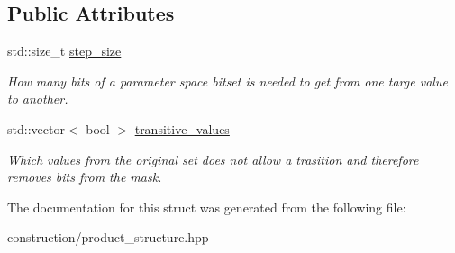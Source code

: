 \subsection*{\-Public \-Attributes}
\begin{DoxyCompactItemize}
\item 
\hypertarget{structProdTransitiontion_ad8491d31e0abb07dd7a4b61b04ed757d}{std\-::size\-\_\-t \hyperlink{structProdTransitiontion_ad8491d31e0abb07dd7a4b61b04ed757d}{step\-\_\-size}}\label{structProdTransitiontion_ad8491d31e0abb07dd7a4b61b04ed757d}

\begin{DoxyCompactList}\small\item\em \-How many bits of a parameter space bitset is needed to get from one targe value to another. \end{DoxyCompactList}\item 
\hypertarget{structProdTransitiontion_a2048f6226ba33b7800ab15986116fd6a}{std\-::vector$<$ bool $>$ \hyperlink{structProdTransitiontion_a2048f6226ba33b7800ab15986116fd6a}{transitive\-\_\-values}}\label{structProdTransitiontion_a2048f6226ba33b7800ab15986116fd6a}

\begin{DoxyCompactList}\small\item\em \-Which values from the original set does not allow a trasition and therefore removes bits from the mask. \end{DoxyCompactList}\end{DoxyCompactItemize}


\-The documentation for this struct was generated from the following file\-:\begin{DoxyCompactItemize}
\item 
construction/product\-\_\-structure.\-hpp\end{DoxyCompactItemize}
